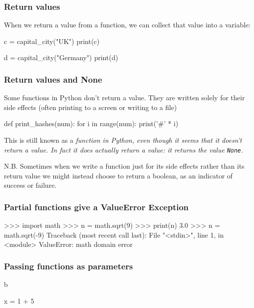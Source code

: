 \documentclass{beamer}
\begin{document}
\begin{frame}[fragile]
\frametitle{Return values}
When we return a value from a function, we can collect that value into
a variable:
\begin{code}
c = capital_city("UK")
print(c)

d = capital_city("Germany")
print(d) 
\end{code}
\end{frame}

\begin{frame}[fragile]
\frametitle{Return values and None}
Some functions in Python don't return a value. They are written
solely for their side effects (often printing to a screen or writing
to a file)
\begin{code}
def print_hashes(num):
   for i in range(num):
      print('#' * i)
\end{code}

This is still known as a \em{function} in Python, even though it seems
that it doesn't return a value. In fact it does actually return a
value: it returns the value \texttt{None}. 

\bigskip

N.B. Sometimes when we write a function just for its side effects rather than
its return value we might instead choose to return a boolean,
as an indicator of success or failure.
\end{frame}

\begin{frame}[fragile]
\frametitle{Partial functions give a ValueError Exception}
\begin{code}
>>> import math
>>> n = math.sqrt(9)
>>> print(n)
3.0
>>> n = math.sqrt(-9)
Traceback (most recent call last):
  File "<stdin>", line 1, in <module>
ValueError: math domain error
\end{code}
\end{frame}


\begin{frame}[fragile]
\frametitle{Passing functions as parameters}
b
\begin{code}
x = 1 + 5
\end{code}
\end{frame}
\end{document}
